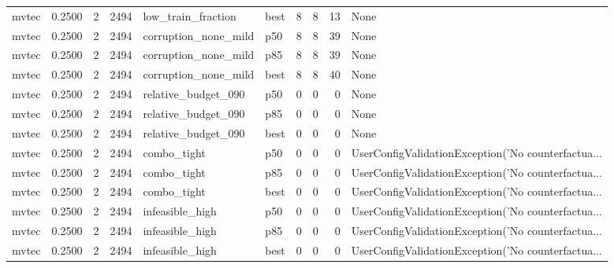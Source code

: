 \begin{tabular}{lrrrllrrrl}
   mvtec &    0.2500 &    2 &   2494 &   low\_train\_fraction &   best &               8 &          8 &      13 &                                               None \\
   mvtec &    0.2500 &    2 &   2494 & corruption\_none\_mild &    p50 &               8 &          8 &      39 &                                               None \\
   mvtec &    0.2500 &    2 &   2494 & corruption\_none\_mild &    p85 &               8 &          8 &      39 &                                               None \\
   mvtec &    0.2500 &    2 &   2494 & corruption\_none\_mild &   best &               8 &          8 &      40 &                                               None \\
   mvtec &    0.2500 &    2 &   2494 &  relative\_budget\_090 &    p50 &               0 &          0 &       0 &                                               None \\
   mvtec &    0.2500 &    2 &   2494 &  relative\_budget\_090 &    p85 &               0 &          0 &       0 &                                               None \\
   mvtec &    0.2500 &    2 &   2494 &  relative\_budget\_090 &   best &               0 &          0 &       0 &                                               None \\
   mvtec &    0.2500 &    2 &   2494 &          combo\_tight &    p50 &               0 &          0 &       0 & UserConfigValidationException('No counterfactua... \\
   mvtec &    0.2500 &    2 &   2494 &          combo\_tight &    p85 &               0 &          0 &       0 & UserConfigValidationException('No counterfactua... \\
   mvtec &    0.2500 &    2 &   2494 &          combo\_tight &   best &               0 &          0 &       0 & UserConfigValidationException('No counterfactua... \\
   mvtec &    0.2500 &    2 &   2494 &      infeasible\_high &    p50 &               0 &          0 &       0 & UserConfigValidationException('No counterfactua... \\
   mvtec &    0.2500 &    2 &   2494 &      infeasible\_high &    p85 &               0 &          0 &       0 & UserConfigValidationException('No counterfactua... \\
   mvtec &    0.2500 &    2 &   2494 &      infeasible\_high &   best &               0 &          0 &       0 & UserConfigValidationException('No counterfactua... \\

\end{tabular}
